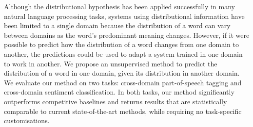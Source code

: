 Although the distributional hypothesis has been applied successfully in many natural language processing tasks, systems using distributional information have been limited to a single domain because the distribution of a word can vary between domains as the word's predominant meaning changes. However, if it were possible to predict how the distribution of a word changes from one domain to another, the predictions could be used to adapt a system trained in one domain to work in another. We propose an unsupervised method to predict the distribution of a word in one domain, given its distribution in another domain. We evaluate our method on two tasks: cross-domain part-of-speech tagging and cross-domain sentiment classification. In both tasks, our method significantly outperforms competitive baselines and returns results that are statistically comparable to current state-of-the-art methods, while requiring no task-specific customisations.
